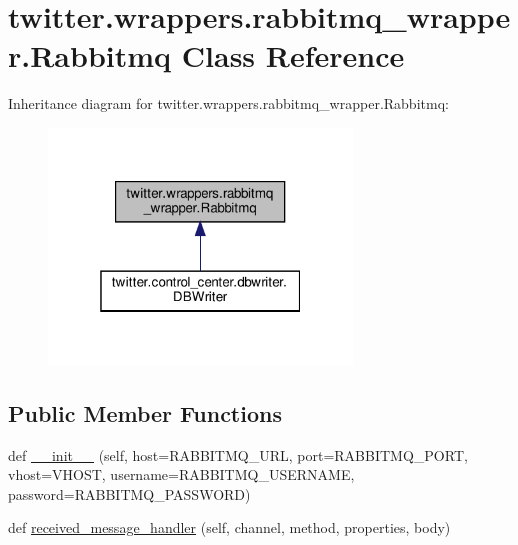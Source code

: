 \hypertarget{classtwitter_1_1wrappers_1_1rabbitmq__wrapper_1_1Rabbitmq}{}\section{twitter.\+wrappers.\+rabbitmq\+\_\+wrapper.\+Rabbitmq Class Reference}
\label{classtwitter_1_1wrappers_1_1rabbitmq__wrapper_1_1Rabbitmq}


Inheritance diagram for twitter.\+wrappers.\+rabbitmq\+\_\+wrapper.\+Rabbitmq\+:
\nopagebreak
\begin{figure}[H]
\begin{center}
\leavevmode
\includegraphics[width=229pt]{classtwitter_1_1wrappers_1_1rabbitmq__wrapper_1_1Rabbitmq__inherit__graph}
\end{center}
\end{figure}
\subsection*{Public Member Functions}
\begin{DoxyCompactItemize}
\item 
def \hyperlink{classtwitter_1_1wrappers_1_1rabbitmq__wrapper_1_1Rabbitmq_aa137a552cf99777a1effb7737d475663}{\+\_\+\+\_\+init\+\_\+\+\_\+} (self, host=R\+A\+B\+B\+I\+T\+M\+Q\+\_\+\+U\+RL, port=R\+A\+B\+B\+I\+T\+M\+Q\+\_\+\+P\+O\+RT, vhost=V\+H\+O\+ST, username=R\+A\+B\+B\+I\+T\+M\+Q\+\_\+\+U\+S\+E\+R\+N\+A\+ME, password=R\+A\+B\+B\+I\+T\+M\+Q\+\_\+\+P\+A\+S\+S\+W\+O\+RD)
\item 
def \hyperlink{classtwitter_1_1wrappers_1_1rabbitmq__wrapper_1_1Rabbitmq_a910cadec1f119ffca78becc55af22a43}{received\+\_\+message\+\_\+handler} (self, channel, method, properties, body)
\end{DoxyCompactItemize}
